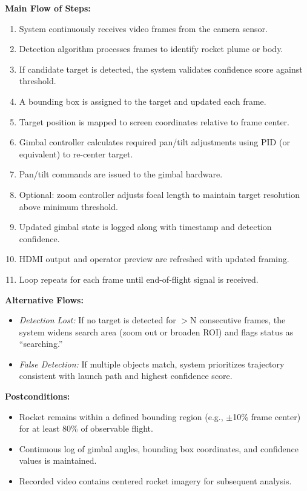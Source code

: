 \documentclass[12pt]{article}
\begin{document}
\textbf{Main Flow of Steps:}
\begin{enumerate}
  \item System continuously receives video frames from the camera sensor.
  \item Detection algorithm processes frames to identify rocket plume or body.
  \item If candidate target is detected, the system validates confidence score against threshold.
  \item A bounding box is assigned to the target and updated each frame.
  \item Target position is mapped to screen coordinates relative to frame center.
  \item Gimbal controller calculates required pan/tilt adjustments using PID (or equivalent) to re-center target.
  \item Pan/tilt commands are issued to the gimbal hardware.
  \item Optional: zoom controller adjusts focal length to maintain target resolution above minimum threshold.
  \item Updated gimbal state is logged along with timestamp and detection confidence.
  \item HDMI output and operator preview are refreshed with updated framing.
  \item Loop repeats for each frame until end-of-flight signal is received.
\end{enumerate}

\textbf{Alternative Flows:}
\begin{itemize}
  \item \emph{Detection Lost:} If no target is detected for $>$N consecutive frames, the system widens search area (zoom out or broaden ROI) and flags status as ``searching.''
  \item \emph{False Detection:} If multiple objects match, system prioritizes trajectory consistent with launch path and highest confidence score.
\end{itemize}

\textbf{Postconditions:}
\begin{itemize}
  \item Rocket remains within a defined bounding region (e.g., $\pm$10\% frame center) for at least 80\% of observable flight.
  \item Continuous log of gimbal angles, bounding box coordinates, and confidence values is maintained.
  \item Recorded video contains centered rocket imagery for subsequent analysis.
\end{itemize}
\end{document}
